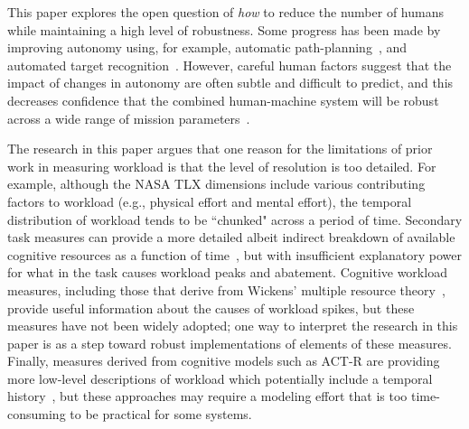 \documentclass[letterpaper]{article}
\begin{document}
This paper explores the open question of {\em how} to reduce the number of humans while maintaining a high level of robustness.  Some progress has been made by improving autonomy using, for example, automatic path-planning~\cite{WongBourgaultFurukawa2005,878915,pettersson2006probabilistic,QuigleyBarberEtAl2005,NelsonBarberMcLainBeard2006}, and automated target recognition~\cite{MorseEnghGoodrich2010,dasgupta2008multiagent,barber2006vision}. However, careful human factors suggest that the impact of changes in autonomy are often subtle and difficult to predict, and this decreases confidence that the combined human-machine system will be robust across a wide range of mission parameters~\cite{KaberEndsley2004,chen2011supervisory,chen2007human}.

The research in this paper argues that one reason for the limitations of prior work in measuring workload is that the level of resolution is too detailed.  For example, although the NASA TLX dimensions include various contributing factors to workload (e.g., physical effort and mental effort), the temporal distribution of workload tends to be ``chunked" across a period of time.  Secondary task measures can provide a more detailed albeit indirect breakdown of available cognitive resources as a function of time~\cite{kaber1999adaptive}, but with insufficient explanatory power for what in the task causes workload peaks and abatement.  Cognitive workload measures, including those that derive from Wickens' multiple resource theory~\cite{wickens2002multiple}, provide useful information about the causes of workload spikes, but these measures have not been widely adopted; one way to interpret the research in this paper is as a step toward robust implementations of elements of these measures.  Finally, measures derived from cognitive models such as ACT-R are providing more low-level descriptions of workload which potentially include a temporal history~\cite{lebiere2013cognitive}, but these approaches may require a modeling effort that is too time-consuming to be practical for some systems.
\end{document}
